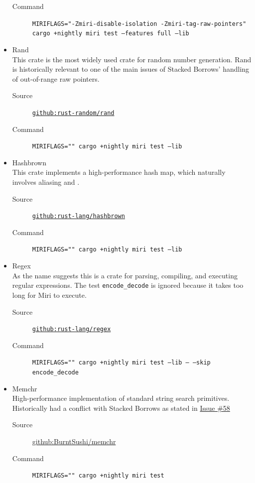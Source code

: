 \documentclass[a4paper,11pt]{article}
\theoremstyle{plain}
\theoremstyle{definition}
\theoremstyle{remark}
\newcommand{\tcode}[1]{\rstinline{#1}}
\begin{document}
\begin{itemize}
\begin{description}
            \item[Command] \texttt{MIRIFLAGS="-Zmiri-disable-isolation -Zmiri-tag-raw-pointers"} \\
                \texttt{cargo +nightly miri test --features full --lib}
        \end{description}
    \item Rand\\
        This crate is the most widely used crate for random number generation.
        Rand is historically relevant to one of the main
        issues \cite{issue_raw_range_strict}
        of Stacked Borrows' handling of out-of-range raw pointers.
        \begin{description}
            \item[Source] \href{https://github.com/rust-random/rand}{\texttt{github:rust-random/rand}}
            \item[Command] \texttt{MIRIFLAGS="" cargo +nightly miri test --lib}
        \end{description}
    \item Hashbrown\\
        This crate implements a high-performance hash map, which naturally involves aliasing and \tcode{unsafe}.
        \begin{description}
            \item[Source] \href{https://github.com/rust-lang/hashbrown}{\texttt{github:rust-lang/hashbrown}}
            \item[Command] \texttt{MIRIFLAGS="" cargo +nightly miri test --lib}
        \end{description}
    \item Regex\\
        As the name suggests this is a crate for parsing, compiling, and executing regular expressions.
        The test \texttt{encode\_decode} is ignored because it takes too long for Miri to execute.
        \begin{description}
            \item[Source] \href{https://github.com/rust-lang/regex}{\texttt{github:rust-lang/regex}}
            \item[Command] \texttt{MIRIFLAGS="" cargo +nightly miri test --lib -- --skip encode\_decode}
        \end{description}
    \item Memchr\\
        High-performance implementation of standard string search primitives.
        Historically had a conflict with Stacked Borrows as stated in
        \href{https://github.com/BurntSushi/memchr/issues/58}{Issue \#58}
        \begin{description}
            \item[Source] \href{https://github.com/BurntSushi/memchr}{github:BurntSushi/memchr}
            \item[Command] \texttt{MIRIFLAGS="" cargo +nightly miri test}
        \end{description}
\end{itemize}
\end{document}
